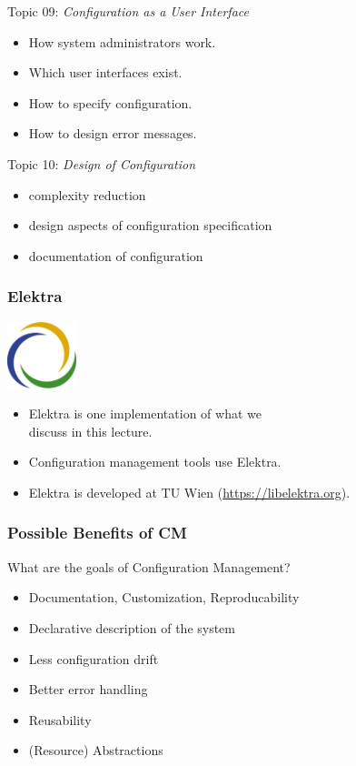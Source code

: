 \begin{frame}
	Topic 09: \textit{Configuration as a User Interface}
	\begin{itemize}
		\item How system administrators work.
		\item Which user interfaces exist.
		\item How to specify configuration.
		\item How to design error messages.
	\end{itemize}
\end{frame}

\begin{frame}
	Topic 10: \textit{Design of Configuration}
	\begin{itemize}
		\item complexity reduction
		\item design aspects of configuration specification
		\item documentation of configuration
	\end{itemize}
\end{frame}


\begin{frame}
	\frametitle{Elektra}
	\hfill \includegraphics[width=2cm]{../figures/logo}
	\vspace{-1cm}
	\begin{itemize}
		\item Elektra is one implementation of what we \\ discuss in this lecture.
		\item Configuration management tools use Elektra.
		\item Elektra is developed at TU Wien (\url{https://libelektra.org}).
	\end{itemize}
\end{frame}

\begin{frame}
	\frametitle{Possible Benefits of CM}

	\begin{task}
	What are the goals of Configuration Management?
	\end{task}

	\pause

	\begin{itemize} %
	\item Documentation, Customization, Reproducability
	\item Declarative description of the system
	\item Less configuration drift
	\item Better error handling
	\item Reusability
	\item (Resource) Abstractions
	\end{itemize}
\end{frame}

